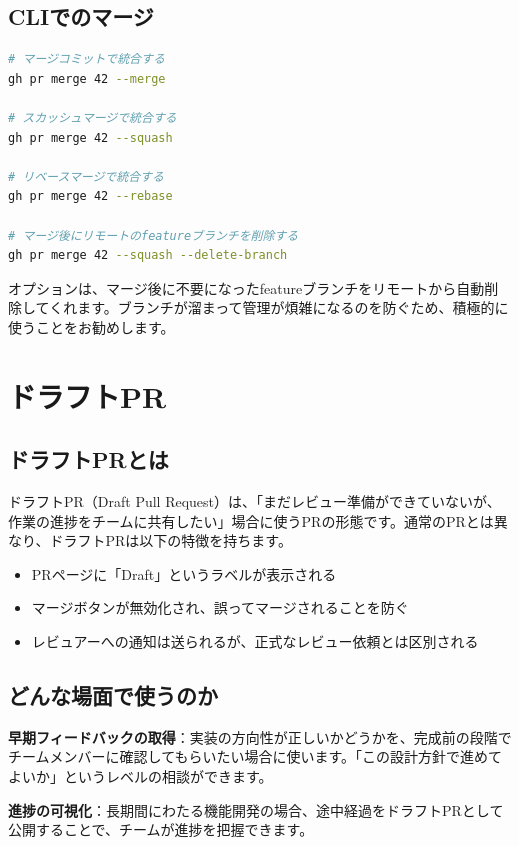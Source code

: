 \subsection{CLIでのマージ}

\begin{lstlisting}[language=bash]
# マージコミットで統合する
gh pr merge 42 --merge

# スカッシュマージで統合する
gh pr merge 42 --squash

# リベースマージで統合する
gh pr merge 42 --rebase

# マージ後にリモートのfeatureブランチを削除する
gh pr merge 42 --squash --delete-branch
\end{lstlisting}

 オプションは、マージ後に不要になったfeatureブランチをリモートから自動削除してくれます。ブランチが溜まって管理が煩雑になるのを防ぐため、積極的に使うことをお勧めします。

\section{ドラフトPR}

\subsection{ドラフトPRとは}

ドラフトPR（Draft Pull Request）は、「まだレビュー準備ができていないが、作業の進捗をチームに共有したい」場合に使うPRの形態です。通常のPRとは異なり、ドラフトPRは以下の特徴を持ちます。

\begin{itemize}
  \item PRページに「Draft」というラベルが表示される
  \item マージボタンが無効化され、誤ってマージされることを防ぐ
  \item レビュアーへの通知は送られるが、正式なレビュー依頼とは区別される
\end{itemize}

\subsection{どんな場面で使うのか}

\textbf{早期フィードバックの取得}：実装の方向性が正しいかどうかを、完成前の段階でチームメンバーに確認してもらいたい場合に使います。「この設計方針で進めてよいか」というレベルの相談ができます。

\textbf{進捗の可視化}：長期間にわたる機能開発の場合、途中経過をドラフトPRとして公開することで、チームが進捗を把握できます。

